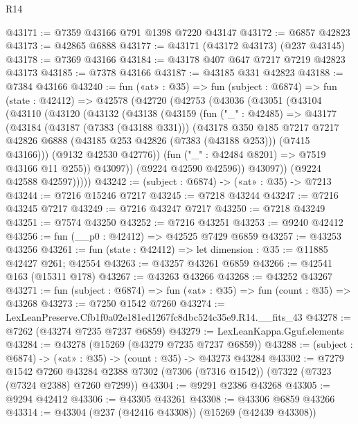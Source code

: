 \begin{lexlean}{R14}
\begin{coremodule}
@43171 := @7359 @43166 @791 @1398 @7220 @43147
@43172 := @6857 @42823
@43173 := @42865 @6888
@43177 := @43171 (@43172 @43173) (@237 @43145)
@43178 := @7369 @43166
@43184 := @43178 @407 @647 @7217 @7219 @42823 @43173
@43185 := @7378 @43166
@43187 := @43185 @331 @42823
@43188 := @7384 @43166
@43240 := fun («at» : @35) =>
  fun (subject : @6874) =>
  fun (state : @42412) =>
  @42578
    (@42720
      (@42753
        (@43036
          (@43051
            (@43104
              (@43110
                (@43120
                  (@43132
                    (@43138
                      (@43159
                        (fun ("_" : @42485) =>
                        @43177
                          (@43184
                            (@43187 (@7383 (@43188 @331)))
                            (@43178
                              @350
                              @185
                              @7217
                              @7217
                              @42826
                              @6888
                              (@43185 @253 @42826 (@7383 (@43188 @253)))
                              (@7415 @43166)))
                          (@9132 @42530 @42776))
                        (fun ("_" : @42484 @8201) => @7519 @43166 @11 @255))
                      @43097))
                  (@9224 @42590 @42596))
                @43097))
            (@9224 @42588 @42597)))))
@43242 := (subject : @6874) -> («at» : @35) -> @7213
@43244 := @7216 @15246 @7217
@43245 := @7218 @43244
@43247 := @7216 @43245 @7217
@43249 := @7216 @43247 @7217
@43250 := @7218 @43249
@43251 := @7574 @43250
@43252 := @7216 @43251
@43253 := @9240 @42412
@43256 := fun (__p0 : @42412) => @42525 @7429 @6859
@43257 := @43253 @43256
@43261 := fun (state : @42412) => let dimension : @35 := @11885 @42427 @261; @42554
@43263 := @43257 @43261 @6859
@43266 := @42541 @163 (@15311 @178)
@43267 := @43263 @43266
@43268 := @43252 @43267
@43271 := fun (subject : @6874) => fun («at» : @35) => fun (count : @35) => @43268
@43273 := @7250 @1542 @7260
@43274 := LexLeanPreserve.Cfb1f0a02e181ed1267fc8dbc524c35e9.R14.__fits_43
@43278 := @7262 (@43274 @7235 @7237 @6859)
@43279 := LexLeanKappa.Gguf.elements
@43284 := @43278 (@15269 (@43279 @7235 @7237 @6859))
@43288 := (subject : @6874) -> («at» : @35) -> (count : @35) -> @43273 @43284
@43302 := @7279
    @1542
    @7260
    @43284
    @2388
    @7302
    (@7306 (@7316 @1542))
    (@7322 (@7323 (@7324 @2388) @7260 @7299))
@43304 := @9291 @2386 @43268
@43305 := @9294 @42412
@43306 := @43305 @43261
@43308 := @43306 @6859 @43266
@43314 := @43304 (@237 (@42416 @43308)) (@15269 (@42439 @43308))

\end{coremodule}
\end{lexlean}
